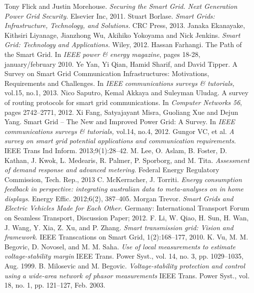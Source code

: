 \documentclass[11pt,oneside]{book}
\begin{document}
\begin{thebibliography}{99}
 Tony Flick and Justin Morehouse. \emph{Securing the Smart Grid. Next Generation Power Grid Security.} Elsevier Inc, 2011.
 Stuart Borlase. \emph{Smart Grids: Infrastructure, Technology, and Solutions.} CRC Press, 2013.
 Janaka Ekanayake, Kithsiri Liyanage, Jianzhong Wu, Akihiko Yokoyama and Nick Jenkins. \emph{Smart Grid: Technology and Applications.} Wiley, 2012.
 Hassan Farhangi. The Path of the Smart Grid. In \emph{IEEE power \& energy magazine}, pages 18-28, january/february 2010.
 Ye Yan, Yi Qian, Hamid Sharif, and David Tipper. A Survey on Smart Grid Communication Infrastructures: Motivations, Requirements and Challenges. In \emph{IEEE communications surveys \& tutorials,} vol.15, no.1, 2013.
 Nico Saputro, Kemal Akkaya and Suleyman Uludag. A survey of routing protocols for smart grid communications. In \emph{Computer Networks 56}, pages 2742–2771, 2012.
 Xi Fang, Satyajayant Misra, Guoliang Xue and Dejun Yang. Smart Grid – The New and Improved Power Grid: A Survey. In \emph{IEEE communications surveys \& tutorials,} vol.14, no.4, 2012.
 Gungor VC, et al. \emph{A survey on smart grid potential applications and
communication requirements}. IEEE Trans Ind Inform. 2013;9(1):28–42.
 M. Lee, O. Aslam, B. Foster, D. Kathan, J. Kwok, L. Medearis,
R. Palmer, P. Sporborg, and M. Tita. \emph{Assessment of demand response
and advanced metering}. Federal Energy Regulatory Commission, Tech. Rep., 2013
 C. McKerracher, J. Torriti. \emph{Energy consumption feedback in perspective: integrating australian data to meta-analyses on in home displays}. Energy Effic. 2012;6(2), 387–405.
 Morgan Trevor. \emph{Smart Grids and Electric Vehicles Made for Each Other}. Germany: International Transport Forum on Seamless Transport, Discussion Paper; 2012.
 F. Li, W. Qiao, H. Sun, H. Wan, J. Wang, Y. Xia, Z. Xu, and P. Zhang.
\emph{Smart transmission grid: Vision and framework}. IEEE Transcations on Smart Grid, 1(2):168–177, 2010.
 K. Vu, M. M. Begovic, D. Novosel, and M. M. Saha. \emph{Use of local measurements to estimate voltage-stability margin} IEEE Trans. Power Syst., vol. 14, no. 3, pp. 1029–1035, Aug. 1999. 
 B. Milosevic and M. Begovic. \emph{Voltage-stability protection and control using a wide-area network of phasor measurements} IEEE Trans. Power Syst., vol. 18, no. 1, pp. 121–127, Feb. 2003. 

\end{thebibliography}
\end{document}
